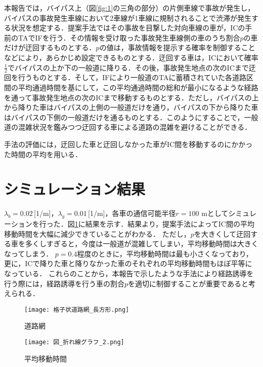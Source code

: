 \documentclass[twocolumn,a4paper,dvipdfmx]{ieicejsp}
\begin{document}
本報告では，バイパス上（図\ref{fig:1}の三角の部分）の片側車線で事故が発生し，バイパスの事故発生車線において2車線が1車線に規制されることで渋滞が発生する状況を想定する．提案手法ではその事故を目撃した対向車線の車が，ICの手前のTAでIFを行う．その情報を受け取った事故発生車線側の車のうち割合$p$の車だけが迂回するものとする．$p$の値は，事故情報を提示する確率を制御することなどにより，あらかじめ設定できるものとする．迂回する車は，ICにおいて確率$\frac{1}{2}$でバイパスの上か下の一般道に降りる．その後，事故発生地点の次のICまで迂回を行うものとする．そして，IFにより一般道のTAに蓄積されていた各道路区間の平均通過時間を基にして，この平均通過時間の総和が最小になるような経路を通って事故発生地点の次のICまで移動するものとする．ただし，バイパスの上から降りた車はバイパスの上側の一般道だけを通り，バイパスの下から降りた車はバイパスの下側の一般道だけを通るものとする．このようにすることで，一般道の混雑状況を鑑みつつ迂回する車による道路の混雑を避けることができる．

手法の評価には，迂回した車と迂回しなかった車がIC間を移動するのにかかった時間の平均を用いる．

\section{シミュレーション結果}
$\lambda_b = 0.02$\,[1/m]，$\lambda_g = 0.01$\,[1/m]，各車の通信可能半径$r = 100$ mとしてシミュレーションを行った．図\ref{fig:2}に結果を示す．結果より，提案手法によってIC間の平均移動時間を大幅に減少できていることがわかる．
ただし，$p$を大きくして迂回する車を多くしすぎると，今度は一般道が混雑してしまい，平均移動時間は大きくなってしまう．
$p=0.4$程度のときに，平均移動時間は最も小さくなっており，更に，ICで降りた車と降りなかった車のそれぞれの平均移動時間もほぼ平等になっている．
これらのことから，本報告で示したような手法により経路誘導を行う際には，経路誘導を行う車の割合$p$を適切に制御することが重要であると考えられる．

\begin{figure}[H]
  \centering
  \begin{minipage}[b]{0.48\linewidth}
    \centering
    \texttt{[image: 格子状道路網\_長方形.png]} %
    \caption{道路網}
    \label{fig:1}
  \end{minipage}\hfill
  \begin{minipage}[b]{0.48\linewidth}
    \centering
    \texttt{[image: 図\_折れ線グラフ\_2.png]} %
    \caption{平均移動時間}
    \label{fig:2}
  \end{minipage}
\end{figure}
\end{document}
